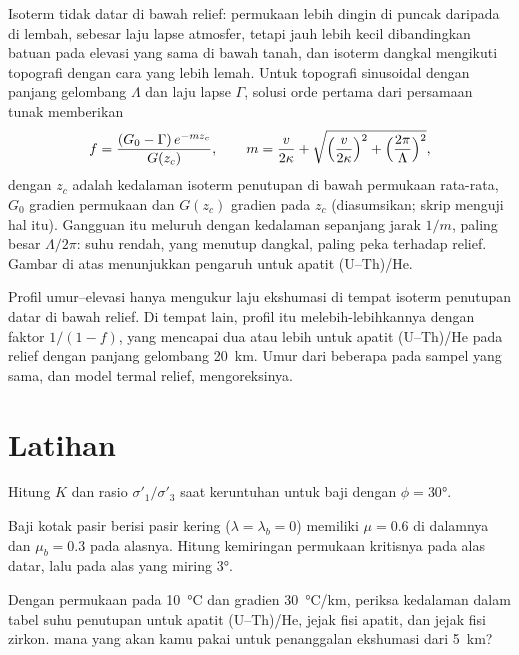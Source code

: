 Isoterm tidak datar di bawah relief: permukaan lebih dingin di puncak
daripada di lembah, sebesar laju lapse atmosfer, tetapi jauh lebih kecil
dibandingkan batuan pada elevasi yang sama di bawah tanah, dan isoterm dangkal
mengikuti topografi dengan cara yang lebih lemah. Untuk topografi sinusoidal dengan
panjang gelombang $\Lambda$ dan laju lapse $\Gamma$, solusi orde pertama dari
persamaan tunak memberikan
\[
  f = \frac{(G_0 - \Gamma)\,e^{-mz_c}}{G(z_c)},\qquad
  m = \frac{v}{2\kappa} + \sqrt{\Bigl(\frac{v}{2\kappa}\Bigr)^2 +
  \Bigl(\frac{2\pi}{\Lambda}\Bigr)^2},
\]
dengan $z_c$ adalah kedalaman isoterm penutupan di bawah permukaan rata-rata,
$G_0$ gradien permukaan dan $G(z_c)$ gradien pada $z_c$ (diasumsikan;
skrip menguji hal itu). Gangguan itu meluruh dengan kedalaman sepanjang
jarak $1/m$, paling besar $\Lambda/2\pi$:  suhu rendah,
yang menutup dangkal, paling peka terhadap relief. Gambar di atas menunjukkan pengaruh
untuk apatit (U--Th)/He.

Profil umur--elevasi hanya mengukur laju ekshumasi di tempat isoterm penutupan
datar di bawah relief. Di tempat lain, profil itu melebih-lebihkannya dengan faktor $1/(1 - f)$, yang mencapai
dua atau lebih untuk apatit (U--Th)/He pada relief dengan panjang gelombang \qty{20}{km}.
Umur dari beberapa  pada sampel yang sama, dan model termal
relief, mengoreksinya.

\section{Latihan}

\begin{exercise}[$\star$]\label{exo:b3:orogenic-wedges:1}
Hitung $K$ dan rasio $\sigma'_1/\sigma'_3$ saat keruntuhan untuk baji dengan
$\phi = \ang{30}$.
\end{exercise}

\begin{exercise}[$\star$]\label{exo:b3:orogenic-wedges:2}
Baji kotak pasir berisi pasir kering ($\lambda = \lambda_b = 0$) memiliki $\mu = 0.6$
di dalamnya dan $\mu_b = 0.3$ pada alasnya. Hitung kemiringan permukaan kritisnya pada alas
datar, lalu pada alas yang miring \ang{3}.
\end{exercise}

\begin{exercise}[$\star$]\label{exo:b3:orogenic-wedges:3}
Dengan permukaan pada \qty{10}{\celsius} dan gradien \qty{30}{\celsius/km},
periksa kedalaman dalam tabel suhu penutupan untuk apatit
(U--Th)/He, jejak fisi apatit, dan jejak fisi zirkon.  mana
yang akan kamu pakai untuk penanggalan ekshumasi dari \qty{5}{km}?
\end{exercise}


